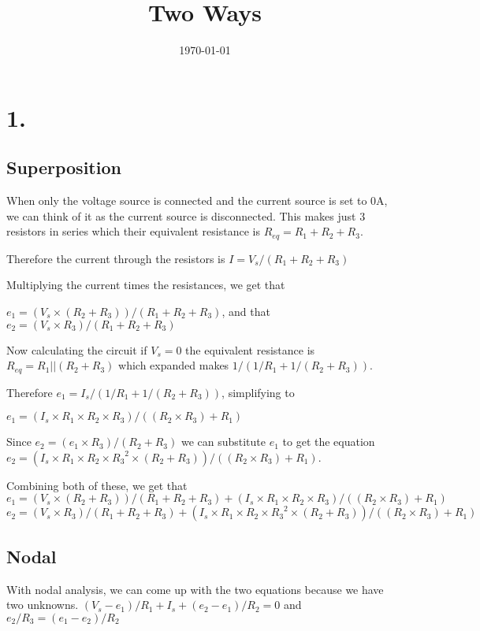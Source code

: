 \documentclass{article}
\begin{document}
\title{Two Ways}
\author{}
\date{\today}

\maketitle

\section*{1.}
\subsection*{Superposition}
\noindent When only the voltage source is connected and the current source is set to 0A,
we can think of it as the current source is disconnected. This makes just 3 resistors in
series which their equivalent resistance is $R_{eq}=R_1+R_2+R_3$.

\noindent Therefore the current through the resistors is $I=V_s/(R_1+R_2+R_3)$

\noindent Multiplying the current times the resistances, we get that

\noindent $e_1=(V_s\times(R_2+R_3))/(R_1+R_2+R_3)$, and that
$e_2=(V_s\times R_3)/(R_1+R_2+R_3)$

\noindent Now calculating the circuit if $V_s=0$ the equivalent resistance is
$R_{eq}=R_1||(R_2+R_3)$ which expanded makes $1/(1/R_1+1/(R_2+R_3))$.

\noindent Therefore
$e_1=I_s/(1/R_1+1/(R_2+R_3))$, simplifying to

\noindent $e_1=(I_s\times R_1\times R_2\times R_3)/((R_2\times R_3)+R_1)$

\noindent Since $e_2=(e_1\times R_3)/(R_2+R_3)$ we can substitute
$e_1$ to get the equation
$e_2=(I_s\times R_1\times R_2\times {R_3}^2\times (R_2+R_3))/((R_2\times R_3)+R_1)$.

\noindent Combining both of these, we get that\newline
$e_1=(V_s\times(R_2+R_3))/(R_1+R_2+R_3)+(I_s\times R_1\times R_2\times R_3)/((R_2\times R_3)+R_1)$
$e_2=(V_s\times R_3)/(R_1+R_2+R_3)+(I_s\times R_1\times R_2\times {R_3}^2\times (R_2+R_3))/((R_2\times R_3)+R_1)$

\subsection*{Nodal}

With nodal analysis, we can come up with the two equations because we have two unknowns.
$(V_s-e_1)/R_1+I_s+(e_2-e_1)/R_2=0$ and $e_2/R_3=(e_1-e_2)/R_2$
\end{document}
